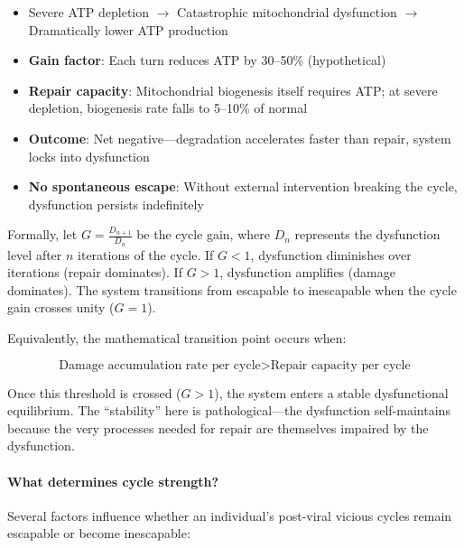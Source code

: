 \begin{itemize}
    \item Severe ATP depletion $\rightarrow$ Catastrophic mitochondrial dysfunction $\rightarrow$ Dramatically lower ATP production
    \item \textbf{Gain factor}: Each turn reduces ATP by 30--50\% (hypothetical)
    \item \textbf{Repair capacity}: Mitochondrial biogenesis itself requires ATP; at severe depletion, biogenesis rate falls to 5--10\% of normal
    \item \textbf{Outcome}: Net negative---degradation accelerates faster than repair, system locks into dysfunction
    \item \textbf{No spontaneous escape}: Without external intervention breaking the cycle, dysfunction persists indefinitely
\end{itemize}

Formally, let $G = \frac{D_{n+1}}{D_n}$ be the cycle gain, where $D_n$ represents the dysfunction level after $n$ iterations of the cycle. If $G < 1$, dysfunction diminishes over iterations (repair dominates). If $G > 1$, dysfunction amplifies (damage dominates). The system transitions from escapable to inescapable when the cycle gain crosses unity ($G = 1$).

Equivalently, the mathematical transition point occurs when:

\[
\text{Damage accumulation rate per cycle} > \text{Repair capacity per cycle}
\]

Once this threshold is crossed ($G > 1$), the system enters a stable dysfunctional equilibrium. The ``stability'' here is pathological---the dysfunction self-maintains because the very processes needed for repair are themselves impaired by the dysfunction.

\paragraph{What determines cycle strength?}

Several factors influence whether an individual's post-viral vicious cycles remain escapable or become inescapable:

